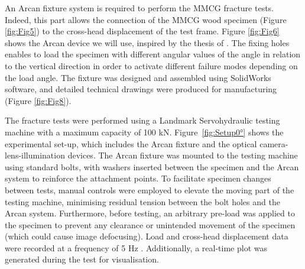 \documentclass[3p,times,procedia]{elsarticle}
\begin{document}
An Arcan fixture system is required to perform the MMCG fracture tests. Indeed, this part allows the connection of the MMCG wood specimen (Figure \ref{fig:Fig5}) to the cross-head displacement of the test frame. Figure \ref{fig:Fig6} shows the Arcan device we will use, inspired by the thesis of \citep{Odounga2018phd}. The fixing holes enables to load the specimen with different angular values of the angle in relation to the vertical direction in order to activate different failure modes depending on the load angle.  The fixture was designed and assembled using SolidWorks software, and detailed technical drawings were produced for manufacturing (Figure \ref{fig:Fig8}).

The fracture tests were performed using a Landmark Servohydraulic testing machine with a maximum capacity of 100 kN. Figure~\ref{fig:Setup0°} shows the experimental set-up, which includes the Arcan fixture and the optical camera-lens-illumination devices. The Arcan fixture was mounted to the testing machine using standard bolts, with washers inserted between the specimen and the Arcan system to reinforce the attachment points. To facilitate specimen changes between tests, manual controls were employed to elevate the moving part of the testing machine, minimising residual tension between the bolt holes and the Arcan system. Furthermore, before testing, an arbitrary pre-load was applied to the specimen to prevent any clearance or unintended movement of the specimen (which could cause image defocusing). Load and cross-head displacement data were recorded at a frequency of 5 Hz . Additionally, a real-time plot was generated during the test for visualisation.
\end{document}
